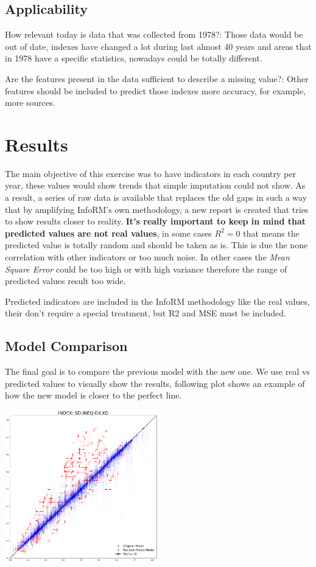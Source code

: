 \documentclass[a4project, twocolumn]{article}
\begin{document}
\subsection{Applicability}

How relevant today is data that was collected from 1978?: Those data would be out of date, indexes have changed a lot during last almost 40 years and areas that in 1978 have a specific statistics, nowadays could be totally different.

Are the features present in the data sufficient to describe a missing value?: Other features should be included to predict those indexes more accuracy, for example, more sources.

\section{Results}

The main objective of this exercise was to have indicators in each country per year, these values would show trends that simple imputation could not show. As a result, a series of raw data is available that replaces the old gaps in such a way that by amplifying InfoRM's own methodology, a new report is created that tries to show results closer to reality.\textbf{ It's really important to keep in mind that predicted values are not real values}, in some cases $R^2=0$ that means the predicted value is totally random and should be taken as is. This is due the none correlation with other indicators or too much noise. In other cases the \textit{Mean Square Error} could be too high or with high variance therefore the range of predicted values result too wide.

Predicted indicators are included in the InfoRM methodology like the real values, their don't require a special treatment, but R2 and MSE must be included.  

\subsection{Model Comparison}
The final goal is to compare the previous model with the new one. We use real vs predicted values to visually show the results, following plot shows an example of how the new model is closer to the perfect line.

\includegraphics[width=0.50\textwidth]{model_comparison.png}\par\vspace{1cm}\label{p3}



\onecolumn

 


\printbibliography[title={References}]
\end{document}
